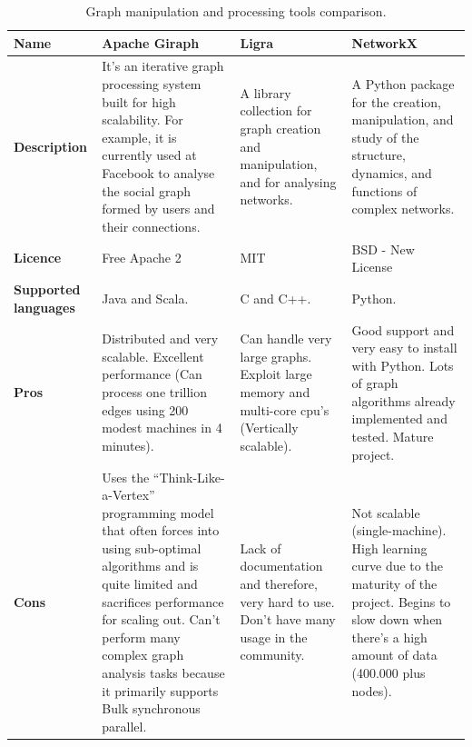 \begin{table}[H]
\caption{Graph manipulation and processing tools comparison.}
\label{table:graph_manipulation_and_processing_tools_comparison}
\centering
\large
\begin{tabularx}{\linewidth} {
    |>{\hsize=0.7\hsize}X| 
     >{\hsize=1.1\hsize}X|
     >{\hsize=1.1\hsize}X| 
     >{\hsize=1.1\hsize}X| }
\hline
\textbf{Name} 
& Apache Giraph \cite{apache_giraph}
& Ligra \cite{ligra_graph_processing_framework}
& NetworkX \cite{networkx} \\ \hline
\textbf{Description}
& It's an iterative graph processing system built for high scalability. For example, it is currently used at Facebook to analyse the social graph formed by users and their connections.
& A library collection for graph creation and manipulation, and for analysing networks. 
& A Python package for the creation, manipulation, and study of the structure, dynamics, and functions of complex networks. \\ \hline
\textbf{Licence}\cite{software_license}
& Free Apache 2
& MIT
& BSD - New License \\ \hline
\textbf{Supported languages} 
& Java and Scala.
& C and C++. 
& Python. \\ \hline
\textbf{Pros} 
& Distributed and very scalable. \newline
Excellent performance (Can process one trillion edges using 200 modest machines in 4 minutes).
& Can handle very large graphs. \newline
Exploit large memory and multi-core \gls{cpu}'s (Vertically scalable).
& Good support and very easy to install with Python. \newline
Lots of graph algorithms already implemented and tested. \newline
Mature project.\\ \hline
\textbf{Cons} 
& Uses the ``Think-Like-a-Vertex'' programming model that often forces into using sub-optimal algorithms and is quite limited and sacrifices performance for scaling out. \newline
Can't perform many complex graph analysis tasks because it primarily supports Bulk synchronous parallel.
& Lack of documentation and therefore, very hard to use. \newline
Don't have many usage in the community.
& Not scalable (single-machine). \newline
High learning curve due to the maturity of the project. \newline
Begins to slow down when there's a high amount of data (400.000 plus nodes). \\ \hline
\end{tabularx}
\end{table}

